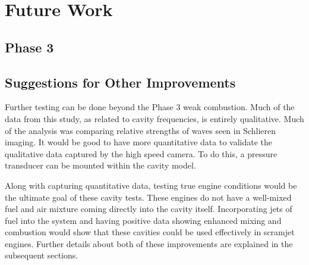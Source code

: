
\chapter{Future Work} %

\label{Chapter6} %



\section{Phase 3}





\section{Suggestions for Other Improvements}

Further testing can be done beyond the Phase 3 weak combustion. Much of the data from this study, as related to cavity frequencies, is entirely qualitative. Much of the analysis was comparing relative strengths of waves seen in Schlieren imaging. It would be good to have more quantitative data to validate the qualitative data captured by the high speed camera. To do this, a pressure transducer can be mounted within the cavity model.  

Along with capturing quantitative data, testing true engine conditions would be the ultimate goal of these cavity tests. These engines do not have a well-mixed fuel and air mixture coming directly into the cavity itself. Incorporating jets of fuel into the system and having positive data showing enhanced mixing and combustion would show that these cavities could be used effectively in scramjet engines. Further details about both of these improvements are explained in the subsequent sections.



